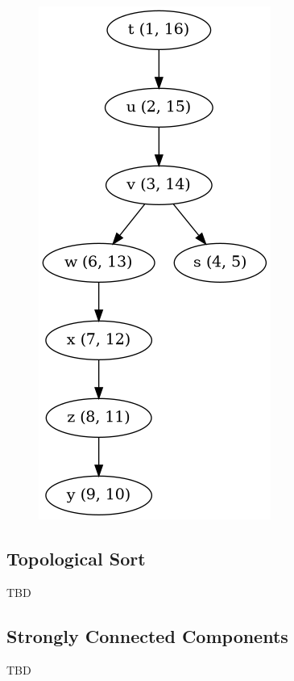 \begin{figure}[H]
\centering
\includegraphics[scale=0.4]{images/dfs_05.png}
\end{figure}


\subsection{Topological Sort}

TBD

\subsection{Strongly Connected Components}

TBD



